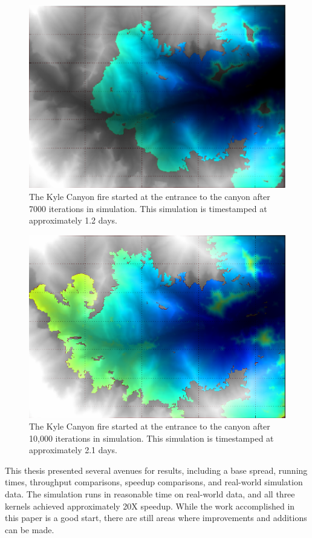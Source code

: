 \begin{figure}%
\centering
  \includegraphics[height=.4\textheight]{figures/results/7000.png}
  \caption{The Kyle Canyon fire started at the entrance to the canyon after 7000 iterations in simulation. This simulation is timestamped at approximately 1.2 days.}
  \label{fig:kyle_7000}
\end{figure} 
\begin{figure}%
\centering
  \includegraphics[height=.4\textheight]{figures/results/overlay_7.png}
  \caption{The Kyle Canyon fire started at the entrance to the canyon after 10,000 iterations in simulation. This simulation is timestamped at approximately 2.1 days.}
  \label{fig:kyle_10000}
\end{figure} 

This thesis presented several avenues for results, including a base spread, running times, throughput comparisons, speedup comparisons, and real-world simulation data. The simulation runs in reasonable time on real-world data, and all three kernels achieved approximately 20X speedup. While the work accomplished in this paper is a good start, there are still areas where improvements and additions can be made. 


